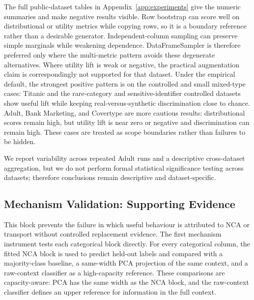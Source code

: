 The full public-dataset tables in Appendix~\ref{app:experiments} give the
numeric summaries and make negative results visible. Row bootstrap can score
well on distributional or utility metrics while copying rows, so it is a
boundary reference rather than a desirable generator. Independent-column
sampling can preserve simple marginals while weakening dependence. DataFrameSampler
is therefore preferred only where the multi-metric pattern avoids these
degenerate alternatives. Where utility lift is weak or negative, the practical
augmentation claim is correspondingly not supported for that dataset.
Under the empirical default, the strongest positive pattern is on the
controlled and small mixed-type cases: Titanic and the rare-category and
sensitive-identifier controlled datasets show useful lift while keeping
real-versus-synthetic discrimination close to chance. Adult, Bank Marketing,
and Covertype are more cautious results: distributional scores remain high, but
utility lift is near zero or negative and discrimination can remain high. These
cases are treated as scope boundaries rather than failures to be hidden.



We report variability across repeated Adult runs and a descriptive
cross-dataset aggregation, but we do not perform formal statistical
significance testing across datasets; therefore conclusions remain descriptive
and dataset-specific.

\subsection{Mechanism Validation: Supporting Evidence}

This block prevents the failure in which useful behaviour is attributed to NCA
or transport without controlled replacement evidence. The first mechanism
instrument tests each categorical block directly. For every categorical column,
the fitted NCA block is used to predict held-out labels and compared with a
majority-class baseline, a same-width PCA projection of the same context, and a
raw-context classifier as a high-capacity reference. These comparisons are
capacity-aware: PCA has the same width as the NCA block, and the raw-context
classifier defines an upper reference for information in the full context.


